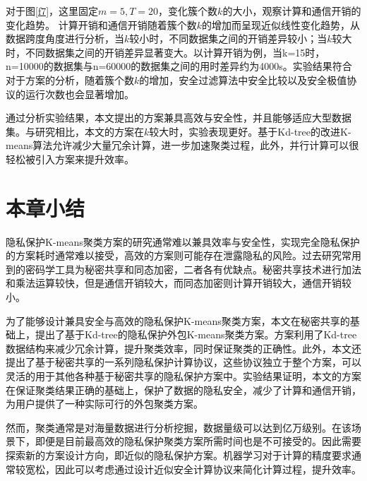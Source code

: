 对于图\ref{f7}，这里固定$ m=5,T=20 $，变化簇个数$ k $的大小，观察计算和通信开销的变化趋势。
计算开销和通信开销随着簇个数$ k $的增加而呈现近似线性变化趋势，从数据跨度角度进行分析，当$ k $较小时，不同数据集之间的开销差异较小；当$ k $较大时，不同数据集之间的开销差异显著变大。以计算开销为例，当k=15时，n=10000的数据集与n=60000的数据集之间的用时差异约为4000s。实验结果符合对于方案的分析，随着簇个数$ k $的增加，安全过滤算法中安全比较以及安全极值协议的运行次数也会显著增加。

通过分析实验结果，本文提出的方案兼具高效与安全性，并且能够适应大型数据集。与研究\cite{wu2020secure,rong2017privacy}相比，本文的方案在$ k $较大时，实验表现更好。基于Kd-tree的改进K-means算法允许减少大量冗余计算，进一步加速聚类过程，此外，并行计算可以很轻松被引入方案来提升效率。

\section{本章小结}
\label{s3-xiaojie}
隐私保护K-means聚类方案的研究通常难以兼具效率与安全性，实现完全隐私保护的方案耗时通常难以接受\cite{jaschke2019unsupervised}，高效的方案则可能存在泄露隐私的风险\cite{wu2020secure}。过去研究常用到的密码学工具为秘密共享\cite{mohassel2019practical}和同态加密\cite{jaschke2019unsupervised}\cite{wu2020secure}，二者各有优缺点。秘密共享技术进行加法和乘法运算较快，但是通信开销较大，而同态加密则计算开销较大，通信开销较小。

为了能够设计兼具安全与高效的隐私保护K-means聚类方案，本文在秘密共享的基础上，提出了基于Kd-tree的隐私保护外包K-means聚类方案。方案利用了Kd-tree数据结构来减少冗余计算，提升聚类效率，同时保证聚类的正确性。此外，本文还提出了基于秘密共享的一系列隐私保护计算协议，这些协议独立于整个方案，可以灵活的用于其他各种基于秘密共享的隐私保护方案中。实验结果证明，本文的方案在保证聚类结果正确的基础上，保护了数据的隐私安全，减少了计算和通信开销，为用户提供了一种实际可行的外包聚类方案。

然而，聚类通常是对海量数据进行分析挖掘，数据量级可以达到亿万级别。在该场景下，即便是目前最高效的隐私保护聚类方案所需时间也是不可接受的。因此需要探索新的方案设计方向，即近似的隐私保护方案。机器学习对于计算的精度要求通常较宽松，因此可以考虑通过设计近似安全计算协议来简化计算过程，提升效率。